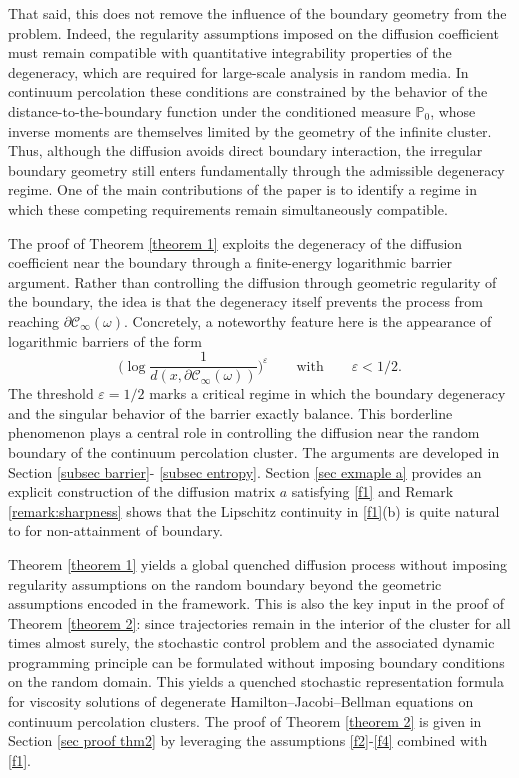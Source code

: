 \documentclass[11pt]{article}
\renewcommand{\P}{\mathbb P}
\theoremstyle{rem}
\begin{document}
That said, this does not remove the influence of the boundary geometry from the problem. Indeed, the regularity assumptions imposed on the diffusion coefficient must remain compatible with quantitative integrability properties of the degeneracy, which are required for large-scale analysis in random media. In continuum percolation these conditions are constrained by the behavior of the distance-to-the-boundary function under the conditioned measure $\P_0$, whose inverse moments are themselves limited by the geometry of the infinite cluster. Thus, although the diffusion avoids direct boundary interaction, the irregular boundary geometry still enters fundamentally through the admissible degeneracy regime.
One of the main contributions of the paper is to identify a regime in which these competing requirements remain simultaneously compatible.

The proof of Theorem \ref{theorem 1} exploits the degeneracy of the diffusion coefficient near the boundary through a finite-energy logarithmic barrier argument. Rather than controlling the diffusion through geometric regularity of the boundary, the idea is that the degeneracy itself prevents the process from reaching $\partial\mathcal C_\infty(\omega)$. Concretely, a noteworthy feature here is the appearance of logarithmic barriers
of the form 
$$
\bigg(\log \frac 1 {d(x,\partial\mathcal C_\infty(\omega))}\bigg)^\varepsilon \qquad \mbox{with}\qquad \varepsilon<1/2.
$$
The threshold
$\varepsilon=1/2$ marks a critical regime in which the boundary degeneracy and
the singular behavior of the barrier exactly balance. This borderline
phenomenon plays a central role in controlling the diffusion near the random
boundary of the continuum percolation cluster. The arguments are developed in Section \ref{subsec barrier}- \ref{subsec entropy}. Section \ref{sec exmaple a} provides an explicit construction of the diffusion matrix $a$ satisfying \ref{f1} and Remark \ref{remark:sharpness} shows that the Lipschitz continuity in \ref{f1}(b) is quite natural to for non-attainment of boundary. 

Theorem \ref{theorem 1} yields a global quenched diffusion process without imposing regularity assumptions on the random boundary beyond the geometric assumptions encoded in the framework. This is also the key input in the proof of Theorem \ref{theorem 2}: since trajectories remain in the interior of the cluster for all times almost surely, the stochastic control problem and the associated dynamic programming principle can be formulated without imposing boundary conditions on the random domain. This yields a quenched stochastic representation formula for viscosity solutions of degenerate Hamilton--Jacobi--Bellman equations on continuum percolation clusters. The proof of Theorem \ref{theorem 2} is given in Section \ref{sec proof thm2} by leveraging the assumptions \ref{f2}-\ref{f4} combined with \ref{f1}. 
\end{document}
